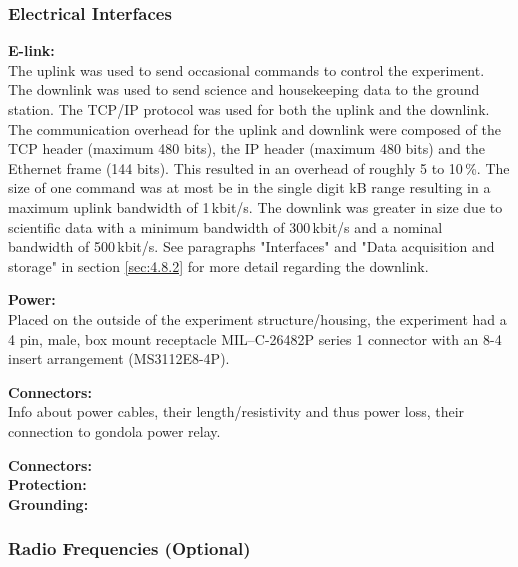 \label{sec:4.2.2}


\subsubsection{Electrical Interfaces}
\label{sec:4.2.3}
\textbf{E-link:}\\
The uplink was used to send occasional commands to control the experiment. The downlink was used to send science and housekeeping data to the ground station. The TCP/IP protocol was used for both the uplink and the downlink. The communication overhead for the uplink and downlink were composed of the TCP header (maximum 480 bits), the IP header (maximum 480 bits) and the Ethernet frame (144 bits). This resulted in an overhead of roughly 5 to 10\,\%. The size of one command was at most be in the single digit kB range resulting in a maximum uplink bandwidth of 1\,kbit/s. The downlink was greater in size due to scientific data with a minimum bandwidth of 300\,kbit/s and a nominal bandwidth of 500\,kbit/s. See paragraphs "Interfaces" and "Data acquisition and storage" in section \ref{sec:4.8.2} for more detail regarding the downlink.

\textbf{Power:}\\

Placed on the outside of the experiment structure/housing, the experiment had a 4 pin, male, box mount receptacle MIL–C-26482P series 1 connector with an 8-4 insert arrangement (MS3112E8-4P).



\textbf{Connectors:}\\

%

Info about power cables, their length/resistivity and thus power loss, their connection to gondola power relay.



\textbf{Connectors:}\\

\textbf{Protection:}\\

\textbf{Grounding:}\\


\subsubsection{Radio Frequencies (Optional)}



\raggedbottom
